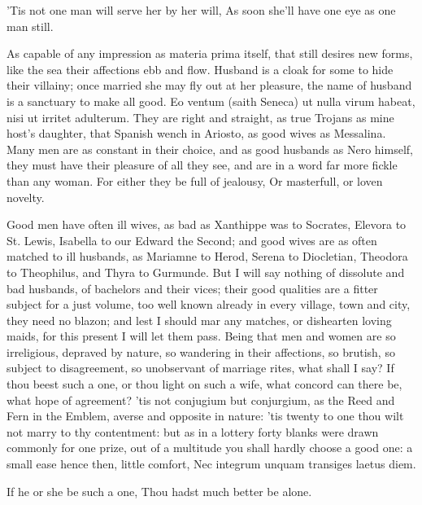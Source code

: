 {'Tis not one man will serve her by her will,
As soon she'll have one eye as one man still.

As capable of any impression as materia prima itself, that still
desires new forms, like the sea their affections ebb and flow. Husband
is a cloak for some to hide their villainy; once married she may fly
out at her pleasure, the name of husband is a sanctuary to make all
good. Eo ventum (saith Seneca) ut nulla virum habeat, nisi ut irritet
adulterum. They are right and straight, as true Trojans as mine host's
daughter, that Spanish wench in Ariosto, as good wives as
Messalina. Many men are as constant in their choice, and as good
husbands as Nero himself, they must have their pleasure of all they
see, and are in a word far more fickle than any woman.
For either they be full of jealousy,
Or masterfull, or loven novelty.

Good men have often ill wives, as bad as Xanthippe was to Socrates,
Elevora to St. Lewis, Isabella to our Edward the Second; and good wives
are as often matched to ill husbands, as Mariamne to Herod, Serena to
Diocletian, Theodora to Theophilus, and Thyra to Gurmunde. But I will
say nothing of dissolute and bad husbands, of bachelors and their
vices; their good qualities are a fitter subject for a just volume, too
well known already in every village, town and city, they need no
blazon; and lest I should mar any matches, or dishearten loving maids,
for this present I will let them pass.
Being that men and women are so irreligious, depraved by nature, so
wandering in their affections, so brutish, so subject to disagreement,
so unobservant of marriage rites, what shall I say? If thou beest such
a one, or thou light on such a wife, what concord can there be, what
hope of agreement? 'tis not conjugium but conjurgium, as the Reed and
Fern in the Emblem, averse and opposite in nature: 'tis twenty to
one thou wilt not marry to thy contentment: but as in a lottery forty
blanks were drawn commonly for one prize, out of a multitude you shall
hardly choose a good one: a small ease hence then, little comfort,
Nec integrum unquam transiges laetus diem.

If he or she be such a one,
Thou hadst much better be alone.

}
